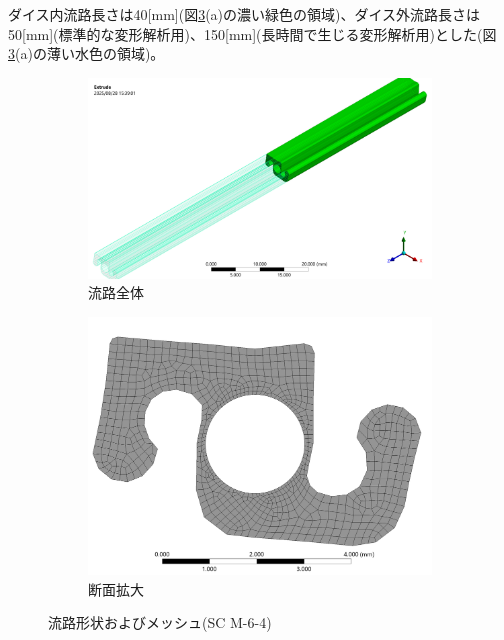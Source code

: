 \documentclass[report]{jlreq}
\begin{document}
ダイス内流路長さは40[mm]({\small 図\ref{fig:geometry_mesh}(a)の濃い緑色の領域})、ダイス外流路長さは50[mm]({\small 標準的な変形解析用})、150[mm]({\small 長時間で生じる変形解析用})とした({\small 図\ref{fig:geometry_mesh}(a)の薄い水色の領域})。

\begin{figure}
  \centering
    \begin{subfigure}{0.45\columnwidth}
      \centering
      \includegraphics[width=\columnwidth]{2508221_mesh.jpg}
      \caption{流路全体}
      \label{fig:mesh1}
    \end{subfigure}
    \hspace{5mm}
    \begin{subfigure}{0.4\columnwidth}
      \centering
      \includegraphics[width=\columnwidth]{2508222_mesh.jpg}
      \caption{断面拡大} 
      \label{fig:mesh2}
    \end{subfigure}
    \caption{流路形状およびメッシュ({\small SC M-6-4})}
    \label{fig:geometry_mesh} 
\end{figure} 
\end{document}
